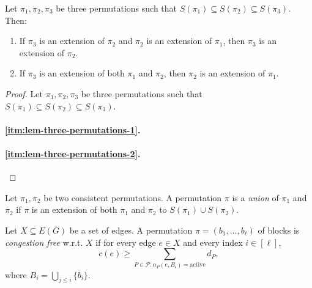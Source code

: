 \documentclass[fontsize=11pt,paper=a4]{book}
\begin{document}
\begin{lem}
Let \(\pi_1,\pi_2,\pi_3\) be three permutations such that \(S(\pi_1)\subseteq S(\pi_2)\subseteq S(\pi_3)\).
Then:

\begin{enumerate}
\item \label{itm:lem-three-permutations-1}
If \(\pi_3\) is an extension of \(\pi_2\) and \(\pi_2\) is an extension of \(\pi_1\), then \(\pi_3\) is an extension of \(\pi_2\).

\item \label{itm:lem-three-permutations-2}
If \(\pi_3\) is an extension of both \(\pi_1\) and \(\pi_2\), then \(\pi_2\) is an extension of \(\pi_1\).
\end{enumerate}
\label{org9abfabb}
\end{lem}

\begin{proof}
Let \(\pi_1,\pi_2,\pi_3\) be three permutations such that \(S(\pi_1)\subseteq S(\pi_2)\subseteq S(\pi_3)\).

\paragraph{\ref{itm:lem-three-permutations-1}.}

\paragraph{\ref{itm:lem-three-permutations-2}.}
\end{proof}

\begin{defn}
Let \(\pi_1,\pi_2\) be two consistent permutations.
A permutation \(\pi\) is a \emph{union} of \(\pi_1\) and \(\pi_2\) if \(\pi\) is an extension of both \(\pi_1\) and \(\pi_2\) to \(S(\pi_1)\cup S(\pi_2)\).
\label{orge0fe414}
\end{defn}

\begin{defn}
Let \(X\subseteq E(G)\) be a set of edges.
A permutation \(\pi=(b_1,\dots,b_{\ell})\) of blocks is \emph{congestion free} w.r.t. \(X\) if for every edge \(e\in X\) and every index \(i\in[\ell]\),
\begin{equation}
\label{eq:org06fe169}
c(e)\geq \sum_{P\in\mathcal{P}:\alpha_P(e,B_i)=\mathrm{active}}d_P,
\end{equation}
where \(B_i=\bigcup_{j\leq i}\{b_i\}\).
\label{org675c0bd}
\end{defn}
\end{document}
